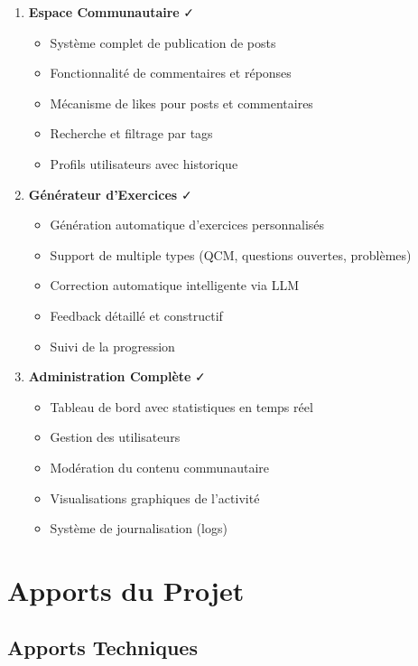 \begin{enumerate}
    \item \textbf{Espace Communautaire} ✓
    \begin{itemize}
        \item Système complet de publication de posts
        \item Fonctionnalité de commentaires et réponses
        \item Mécanisme de likes pour posts et commentaires
        \item Recherche et filtrage par tags
        \item Profils utilisateurs avec historique
    \end{itemize}
    
    \item \textbf{Générateur d'Exercices} ✓
    \begin{itemize}
        \item Génération automatique d'exercices personnalisés
        \item Support de multiple types (QCM, questions ouvertes, problèmes)
        \item Correction automatique intelligente via LLM
        \item Feedback détaillé et constructif
        \item Suivi de la progression
    \end{itemize}
    
    \item \textbf{Administration Complète} ✓
    \begin{itemize}
        \item Tableau de bord avec statistiques en temps réel
        \item Gestion des utilisateurs
        \item Modération du contenu communautaire
        \item Visualisations graphiques de l'activité
        \item Système de journalisation (logs)
    \end{itemize}
\end{enumerate}

\section*{Apports du Projet}

\subsection*{Apports Techniques}

